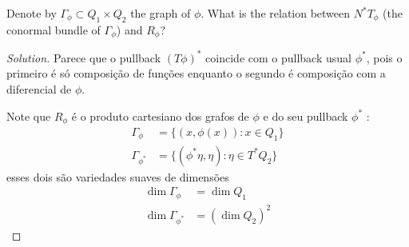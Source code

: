 Denote by $\Gamma_\phi\subset Q_1\times Q_2$ the graph of $\phi$. What is the relation between $N^*T_\phi$ (the conormal bundle of $\Gamma_\phi$) and  $R_\phi$?

\begin{proof}[Solution]\leavevmode
	Parece que o pullback $(T\phi)^*$ coincide com o pullback usual  $\phi^*$, pois o primeiro \'e s\'o composi\c c\~ao de fun\c c\~oes enquanto o segundo \'e composi\c c\~ao com a diferencial de $\phi$.

	Note que $R_\phi$ \'e o produto cartesiano dos grafos de $\phi$ e do seu pullback $\phi^*$ :
	\begin{align*}
		\Gamma_\phi&=\{(x,\phi(x)):x\in Q_1\} \\
		\Gamma_{\phi^*}&=\{\left( \phi^*\eta,\eta \right) :\eta\in T^*Q_2\}
	\end{align*}
	esses dois s\~ao variedades suaves de dimens\~oes
	\begin{align*}
		\dim \Gamma_\phi&=\dim Q_1\\
		\dim \Gamma_{\phi^*}&=(\dim Q_2)^2
	\end{align*}

\end{proof}


